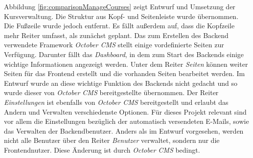         Abbildung \ref{fig:comparisonManageCourses} zeigt Entwurf und Umsetzung der Kursverwaltung.
        Die Struktur aus Kopf- und Seitenleiste wurde übernommen.
        Die Fußzeile wurde jedoch entfernt.
        Es fällt außerdem auf, dass die Kopfzeile mehr Reiter umfasst, als zunächst geplant.
        Das zum Erstellen des Backend verwendete Framework \textit{October CMS} stellt einige vordefinierte Seiten zur Verfügung.
        Darunter fällt das \textit{Dashboard}, in dem zum Start des Backends einige wichtige Informationen angezeigt werden.
        Unter dem Reiter \textit{Seiten} können weiter Seiten für das Frontend erstellt und die vorhanden Seiten bearbeitet werden.
        Im Entwurf wurde an diese wichtige Funktion des Backends nicht gedacht und so wurde dieser von \textit{October CMS} bereitgestellte  übernommen.
        Der Reiter \textit{Einstellungen} ist ebenfalls von \textit{October CMS} bereitgestellt und erlaubt das Andern und Verwalten verschiedenste Optionen.
        Für dieses Projekt relevant sind vor allem die Einstellungen bezüglich der automatisch versendeten E-Mails, sowie das Verwalten der Backendbenutzer.
        Anders als im Entwurf vorgesehen, werden nicht alle Benutzer über den Reiter \textit{Benutzer} verwaltet, sondern nur die Frontendnutzer.
        Diese Änderung ist durch \textit{October CMS} bedingt.
        
